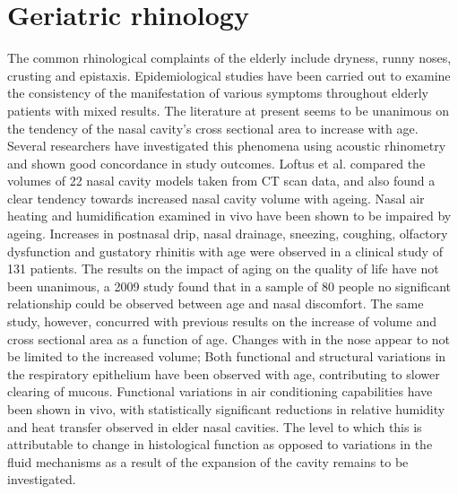 
\section{Geriatric rhinology}
The common rhinological complaints of the elderly include dryness, runny noses, crusting and epistaxis\cite{Varga-Huettner2013}. Epidemiological studies have been carried out to examine the consistency of the manifestation of various symptoms throughout elderly patients with mixed results. The literature at present seems to be unanimous on the tendency of the nasal cavity's cross sectional area to increase with age. Several researchers have investigated this phenomena using acoustic rhinometry and shown good concordance in study outcomes\cite{Kalmovich2005, Edelstein1996,WhanKim2007,Lindemann2008}. Loftus et al. \cite{Loftus2016} compared the volumes of 22 nasal cavity models taken from CT scan data, and also found a clear tendency towards increased nasal cavity volume with ageing. Nasal air heating and humidification examined in vivo have been shown to be impaired by ageing\cite{Lindemann2008}. Increases in postnasal drip, nasal drainage, sneezing, coughing, olfactory dysfunction and gustatory rhinitis with age were observed in a clinical study of 131 patients\cite{Edelstein1996}. The results on the impact of aging on the quality of life have not been unanimous, a 2009 study found that in a sample of 80 people no significant relationship could be observed between age and nasal discomfort\cite{Lindemann2010}. The same study, however, concurred with previous results on the increase of volume and cross sectional area as a function of age. Changes with in the nose appear to not be limited to the increased volume; Both functional and structural variations in the respiratory epithelium have been observed with age, contributing to slower clearing of mucous\cite{HO2001}. Functional variations in air conditioning capabilities have been shown in vivo\cite{Lindemann2008}, with statistically significant reductions in relative humidity and heat transfer observed in elder nasal cavities. The level to which this is attributable to change in histological function as opposed to variations in the fluid mechanisms as a result of the expansion of the cavity remains to be investigated.

